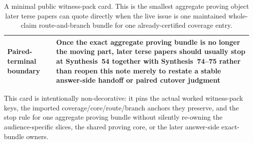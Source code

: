 \documentclass[11pt]{article}
\begin{document}
\begin{table}[t]
\begin{tabularx}{\linewidth}{@{}lX@{}}
Paired-terminal boundary & Once the exact aggregate proving bundle is no longer the moving part, later terse papers should usually stop at Synthesis~54 together with Synthesis~74--75 rather than reopen this note merely to restate a stable answer-side handoff or paired cutover judgment \\
\bottomrule
\end{tabularx}
\caption{A minimal public witness-pack card. This is the smallest aggregate proving object later terse papers can quote directly when the live issue is one maintained whole-claim route-and-branch bundle for one already-certified coverage entry.}
\label{tab:minimal-public-witness-pack-card}
\end{table}

This card is intentionally non-decorative: it pins the actual worked witness-pack keys, the imported coverage/core/route/branch anchors they preserve, and the stop rule for one aggregate proving bundle without silently re-owning the audience-specific slices, the shared proving core, or the later answer-side exact-bundle owners.\cite{series:workedexample}
\end{document}
